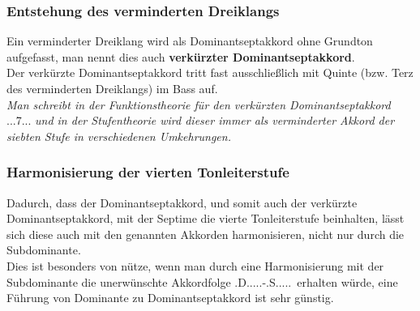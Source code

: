 \documentclass[a4paper]{article}
\renewcommand{\S}{\HH.S.....}
\newcommand{\D}{\HH.D.....}
\newcommand{\Dhochv}[2]{\HH.\Ohne{D}.#2.#1...} %
\begin{document}
	\subsubsection{Entstehung des verminderten Dreiklangs}
	Ein verminderter Dreiklang wird als Dominantseptakkord ohne Grundton aufgefasst, man nennt dies auch \textbf{verkürzter Dominantseptakkord}.\\
	Der verkürzte Dominantseptakkord tritt fast ausschließlich mit Quinte (bzw. Terz des verminderten Dreiklangs) im Bass auf.\\
	\textit{Man schreibt in der Funktionstheorie für den verkürzten Dominantseptakkord} \Dhochv{7}{} \textit{und in der Stufentheorie wird dieser immer als verminderter Akkord der siebten Stufe in verschiedenen Umkehrungen.}
	
	\subsubsection{Harmonisierung der vierten Tonleiterstufe}
	Dadurch, dass der Dominantseptakkord, und somit auch der verkürzte Dominantseptakkord, mit der Septime die vierte Tonleiterstufe beinhalten, lässt sich diese auch mit den genannten Akkorden harmonisieren, nicht nur durch die Subdominante.\\
	Dies ist besonders von nütze, wenn man durch eine Harmonisierung mit der Subdominante die unerwünschte Akkordfolge \D-\S\ erhalten würde, eine Führung von Dominante zu Dominantseptakkord ist sehr günstig.
	
\end{document}
